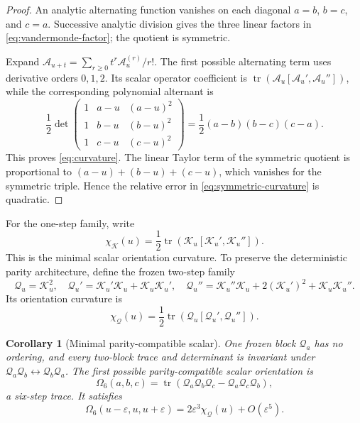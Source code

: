 \documentclass[11pt]{article}
\newtheorem{corollary}[theorem]{Corollary}
\theoremstyle{definition}
\theoremstyle{remark}
\newcommand{\cK}{\mathcal K}
\newcommand{\cA}{\mathcal A}
\newcommand{\cQ}{\mathcal Q}
\newcommand{\tr}{\operatorname{tr}}
\begin{document}
\begin{proof}
An analytic alternating function vanishes on each diagonal $a=b$, $b=c$,
and $c=a$.  Successive analytic division gives the three linear factors in
\eqref{eq:vandermonde-factor}; the quotient is symmetric.

Expand $\cA_{u+t}=\sum_{r\ge0}t^r\cA_u^{(r)}/r!$.  The first possible
alternating term uses derivative orders $0,1,2$.  Its scalar operator
coefficient is
$\tr(\cA_u[\cA_u',\cA_u''])$, while the corresponding polynomial alternant is
\[
 \frac12\det
 \begin{pmatrix}
 1&a-u&(a-u)^2\\
 1&b-u&(b-u)^2\\
 1&c-u&(c-u)^2
 \end{pmatrix}
 =\frac12(a-b)(b-c)(c-a).
\]
This proves \eqref{eq:curvature}.  The linear Taylor term of the symmetric
quotient is proportional to
$(a-u)+(b-u)+(c-u)$, which vanishes for the symmetric triple.  Hence the
relative error in \eqref{eq:symmetric-curvature} is quadratic.
\end{proof}

For the one-step family, write
\begin{equation}\label{eq:chi-k}
 \chi_{\cK}(u)=\frac12\tr\left(
 \cK_u[\cK_u',\cK_u'']\right).
\end{equation}
This is the minimal scalar orientation curvature.  To preserve the
deterministic parity architecture, define the frozen two-step family
\begin{equation}\label{eq:q-family}
 \cQ_u=\cK_u^2,
 \quad
 \cQ_u'=\cK_u'\cK_u+\cK_u\cK_u',
 \quad
 \cQ_u''=\cK_u''\cK_u+2(\cK_u')^2+\cK_u\cK_u''.
\end{equation}
Its orientation curvature is
\begin{equation}\label{eq:chi-q}
 \chi_{\cQ}(u)=\frac12\tr\left(
 \cQ_u[\cQ_u',\cQ_u'']\right).
\end{equation}

\begin{corollary}[Minimal parity-compatible scalar]
\label{cor:six-step}
One frozen block $\cQ_a$ has no ordering, and every two-block trace and
determinant is invariant under $\cQ_a\cQ_b\leftrightarrow\cQ_b\cQ_a$.
The first possible parity-compatible scalar orientation is
\begin{equation}\label{eq:omega-six}
 \Omega_6(a,b,c)
 =\tr\left(\cQ_a\cQ_b\cQ_c-\cQ_a\cQ_c\cQ_b\right),
\end{equation}
a six-step trace.  It satisfies
\[
 \Omega_6(u-\varepsilon,u,u+\varepsilon)
 =2\varepsilon^3\chi_{\cQ}(u)+O(\varepsilon^5).
\]
\end{corollary}
\end{document}
